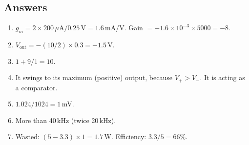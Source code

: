 \subsection*{Answers}
\begin{enumerate}
  \item $g_m = 2 \times 200\,\mu\text{A}/0.25\,\text{V} = 1.6$\,mA/V. Gain $= -1.6\times10^{-3} \times 5000 = -8$.
  \item $V_{\text{out}} = -(10/2) \times 0.3 = -1.5$\,V.
  \item $1 + 9/1 = 10$.
  \item It swings to its maximum (positive) output, because $V_+ > V_-$. It is acting as a comparator.
  \item $1.024/1024 = 1$\,mV.
  \item More than 40\,kHz (twice 20\,kHz).
  \item Wasted: $(5 - 3.3) \times 1 = 1.7$\,W. Efficiency: $3.3/5 = 66\%$.
\end{enumerate}
